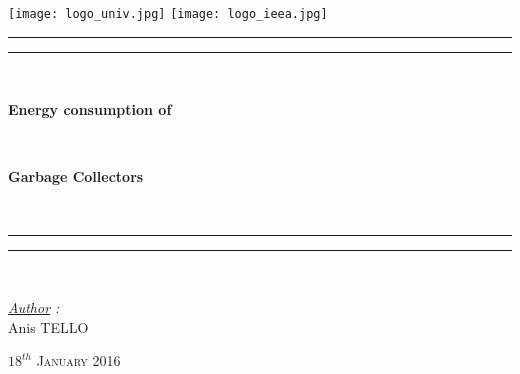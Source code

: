 \thispagestyle{cover}

\texttt{[image: logo\_univ.jpg]}
 \hfill \texttt{[image: logo\_ieea.jpg]} \\

\vspace*{15mm}

\begin{center}

	\vspace*{15mm}

	\rule[0.5ex]{\linewidth}{2pt}\vspace*{-\baselineskip}\vspace*{3.2pt}
	\rule[0.5ex]{\linewidth}{1pt}\\[\baselineskip]

		\begin{Huge} \textbf{Energy consumption of} \end{Huge}\\[4mm]
		\begin{Huge} \textbf{Garbage Collectors} \end{Huge}\\[4mm]
	\rule[0.5ex]{\linewidth}{1pt}\vspace*{-\baselineskip}\vspace{3.2pt}
	\rule[0.5ex]{\linewidth}{2pt}\\

	\vspace*{20mm}

	{\LARGE \textit{\underline{Author} :}}\\
	\vspace*{3mm}
	{\LARGE Anis TELLO}\\
	
	\vspace*{20mm}
	
	{\LARGE\textsc{$18^{th}$ January 2016}}
\end{center}